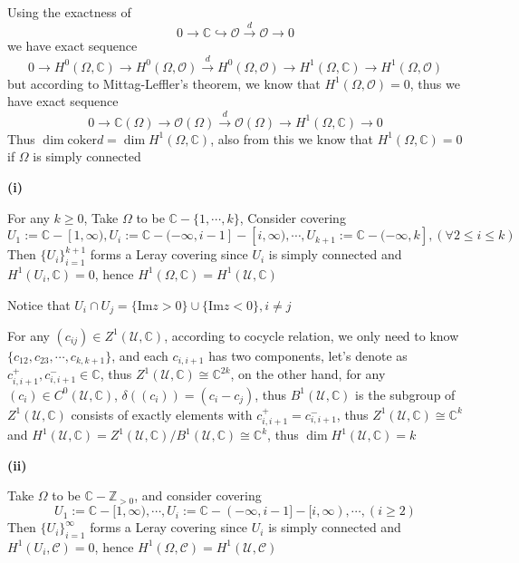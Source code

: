 \documentclass[../main.tex]{subfiles}
\begin{document}
\begin{problem}
Using the exactness of
\[
0\rightarrow \mathbb{C}\hookrightarrow\mathcal{O}\xrightarrow{d}\mathcal{O}\rightarrow 0
\]
we have exact sequence
\[
0\rightarrow H^{0}(\Omega,\mathbb{C})\rightarrow H^{0}(\Omega,\mathcal{O})\xrightarrow{d}H^{0}(\Omega,\mathcal{O})\rightarrow H^{1}(\Omega,\mathbb{C})\rightarrow H^{1}(\Omega,\mathcal{O})
\]
but according to Mittag-Leffler's theorem, we know that $H^{1}(\Omega,\mathcal{O})=0$, thus we have exact sequence
\[
0\rightarrow \mathbb{C}(\Omega)\rightarrow\mathcal{O}(\Omega)\xrightarrow{d}\mathcal{O}(\Omega)\rightarrow H^{1}(\Omega,\mathbb{C})\rightarrow 0
\]
Thus $\dim\mathrm{coker}d=\dim H^{1}(\Omega,\mathbb{C})$, also from this we know that $H^{1}(\Omega,\mathbb{C})=0$ if $\Omega$ is simply connected \par
\textbf{(i)} \par
For any $k\geq 0$, Take $\Omega$ to be $\mathbb{C}-\{1,\cdots,k\}$, Consider covering $$U_{1}:=\mathbb{C}-[1,\infty), U_{i}:=\mathbb{C}-(-\infty,i-1]-[i,\infty), \cdots, U_{k+1}:=\mathbb{C}-(-\infty,k], \left(\forall 2\leq i\leq k\right)$$Then $\{U_{i}\}_{i=1}^{k+1}$ forms a Leray covering since $U_{i}$ is simply connected and $H^{1}(U_{i},\mathbb{C})=0$, hence $H^{1}(\Omega,\mathbb{C})=H^{1}(\mathcal{U},\mathbb{C})$ \par
Notice that $U_{i}\cap U_{j}=\{\mathrm{Im}z>0\}\cup\{\mathrm{Im}z<0\}, i\neq j$ \par
For any $(c_{ij})\in Z^{1}(\mathcal{U},\mathbb{C})$, according to cocycle relation, we only need to know $\{c_{12},c_{23},\cdots,c_{k,k+1}\}$, and each $c_{i,i+1}$ has two components, let's denote as $c_{i,i+1}^{+},c_{i,i+1}^{-}\in \mathbb{C}$, thus $Z^{1}(\mathcal{U},\mathbb{C})\cong \mathbb{C}^{2k}$, on the other hand, for any $(c_{i})\in C^{0}(\mathcal{U},\mathbb{C})$, $\delta\left((c_{i})\right)=(c_{i}-c_{j})$, thus $B^{1}(\mathcal{U},\mathbb{C})$ is the subgroup of $Z^{1}(\mathcal{U},\mathbb{C})$ consists of exactly elements with $c_{i,i+1}^{+}=c_{i,i+1}^{-}$, thus $Z^{1}(\mathcal{U},\mathbb{C})\cong \mathbb{C}^{k}$ and $H^{1}(\mathcal{U},\mathbb{C})=Z^{1}(\mathcal{U},\mathbb{C})/B^{1}(\mathcal{U},\mathbb{C})\cong\mathbb{C}^{k}$, thus $\dim H^{1}(\mathcal{U},\mathbb{C})=k$ \par
\textbf{(ii)} \par
Take $\Omega$ to be $\mathbb{C}-\mathbb{Z}_{>0}$, and consider covering$$U_{1}:=\mathbb{C}-[1,\infty), \cdots, U_{i}:=\mathbb{C}-(-\infty,i-1]-[i,\infty), \cdots, \left(i\geq 2\right)$$Then $\{U_{i}\}_{i=1}^{\infty}$ forms a Leray covering since $U_{i}$ is simply connected and $H^{1}(U_{i},\mathcal{C})=0$, hence $H^{1}(\Omega,\mathcal{C})=H^{1}(\mathcal{U},\mathcal{C})$ \par

\end{problem}
\end{document}
